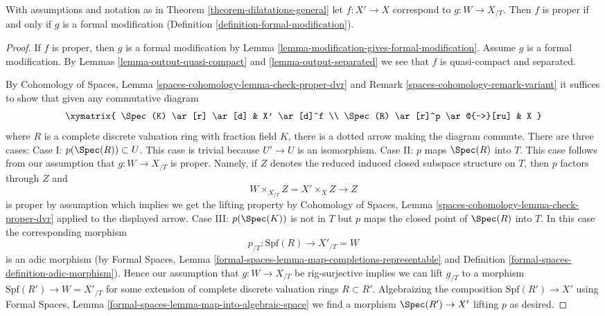\begin{lemma}
\label{lemma-output-proper}
With assumptions and notation as in Theorem \ref{theorem-dilatations-general}
let $f : X' \to X$ correspond to $g : W \to X_{/T}$.
Then $f$ is proper if and only if $g$ is a formal modification
(Definition \ref{definition-formal-modification}).
\end{lemma}

\begin{proof}
If $f$ is proper, then $g$ is a formal modification by
Lemma \ref{lemma-modification-gives-formal-modification}.
Assume $g$ is a formal modification. By
Lemmas \ref{lemma-output-quasi-compact} and \ref{lemma-output-separated}
we see that $f$ is quasi-compact and separated.

\medskip\noindent
By Cohomology of Spaces, Lemma \ref{spaces-cohomology-lemma-check-proper-dvr}
and Remark \ref{spaces-cohomology-remark-variant}
it suffices to show that given any commutative diagram
$$
\xymatrix{
\Spec(K) \ar[r] \ar[d] & X' \ar[d]^f \\
\Spec(R) \ar[r]^p \ar@{-->}[ru] & X
}
$$
where $R$ is a complete discrete valuation ring with fraction field $K$,
there is a dotted arrow making the diagram commute.
There are three cases:
Case I: $p(\Spec(R)) \subset U$. This case is trivial
because $U' \to U$ is an isomorphism.
Case II: $p$ maps $\Spec(R)$ into $T$. This case follows
from our assumption that $g : W \to X_{/T}$ is proper. Namely,
if $Z$ denotes the reduced induced closed subspace structure
on $T$, then $p$ factors through $Z$ and
$$
W \times_{X_{/T}} Z = X' \times_X Z \longrightarrow Z
$$
is proper by assumption which implies we get the lifting property by
Cohomology of Spaces, Lemma \ref{spaces-cohomology-lemma-check-proper-dvr}
applied to the displayed arrow. Case III: $p(\Spec(K))$ is not in $T$
but $p$ maps the closed point of $\Spec(R)$ into $T$. In this case
the corresponding morphism
$$
p_{/T} : \text{Spf}(R) \longrightarrow X'_{/T} = W
$$
is an adic morphism (by
Formal Spaces, Lemma
\ref{formal-spaces-lemma-map-completions-representable} and
Definition \ref{formal-spaces-definition-adic-morphism}).
Hence our assumption that $g : W \to X_{/T}$ be rig-surjective
implies we can lift $g_{/T}$ to a morphism
$\text{Spf}(R') \to W = X'_{/T}$
for some extension of complete discrete valuation rings $R \subset R'$.
Algebraizing the composition $\text{Spf}(R') \to X'$ using
Formal Spaces, Lemma \ref{formal-spaces-lemma-map-into-algebraic-space}
we find a morphism $\Spec(R') \to X'$ lifting $p$ as desired.
\end{proof}





